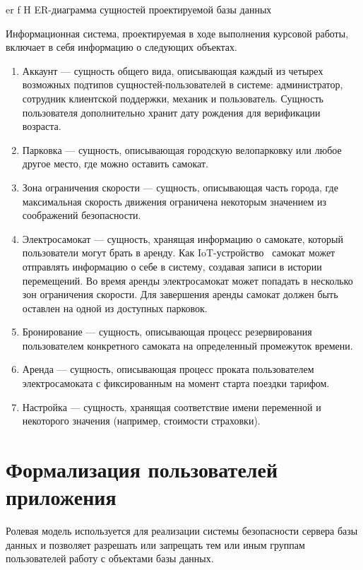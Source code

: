     {er}
    {f}
    {H}
    {\textwidth}
    {ER-диаграмма сущностей проектируемой базы данных}

Информационная система, проектируемая в ходе выполнения курсовой работы, включает в себя информацию о следующих объектах.

\begin{enumerate}
    \item Аккаунт --- сущность общего вида, описывающая каждый из четырех возможных подтипов сущностей-пользователей в системе: администратор, сотрудник клиентской поддержки, механик и пользователь. Сущность пользователя дополнительно хранит дату рождения для верификации возраста.
    \item Парковка --- сущность, описывающая городскую велопарковку или любое другое место, где можно оставить самокат.
    \item Зона ограничения скорости --- сущность, описывающая часть города, где максимальная скорость движения ограничена некоторым значением из соображений безопасности.
    \item Электросамокат --- сущность, хранящая информацию о самокате, который пользователи могут брать в аренду. Как IoT-устройство~\cite{iot} самокат может отправлять информацию о себе в систему, создавая записи в истории перемещений. Во время аренды электросамокат может попадать в несколько зон ограничения скорости. Для завершения аренды самокат должен быть оставлен на одной из доступных парковок.
    \item Бронирование --- сущность, описывающая процесс резервирования пользователем конкретного самоката на определенный промежуток времени.
    \item Аренда --- сущность, описывающая процесс проката пользователем электросамоката с фиксированным на момент старта поездки тарифом.
    \item Настройка --- сущность, хранящая соответствие имени переменной и некоторого значения (например, стоимости страховки).
\end{enumerate}

\section{Формализация пользователей приложения}

Ролевая модель используется для реализации системы безопасности сервера базы данных и позволяет разрешать или запрещать тем или иным группам пользователей работу с объектами базы данных.


